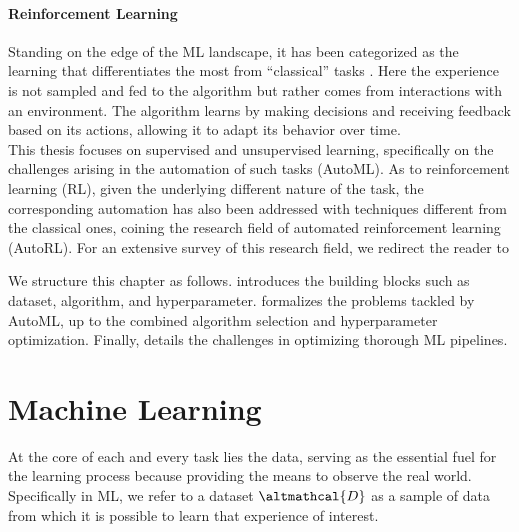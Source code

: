 \paragraph{Reinforcement Learning}
Standing on the edge of the ML landscape, it has been categorized as the learning that differentiates the most from ``classical'' tasks \cite{sutton2018reinforcement}.
Here the experience is not sampled and fed to the algorithm but rather comes from interactions with an environment.
The algorithm learns by making decisions and receiving feedback based on its actions, allowing it to adapt its behavior over time.\\

This thesis focuses on supervised and unsupervised learning, specifically on the challenges arising in the automation of such tasks (AutoML).
As to reinforcement learning (RL), given the underlying different nature of the task, the corresponding automation has also been addressed with techniques different from the classical ones, coining the research field of automated reinforcement learning (AutoRL).
For an extensive survey of this research field, we redirect the reader to \cite{autorl}

We structure this chapter as follows.  introduces the building blocks such as dataset, algorithm, and hyperparameter.
 formalizes the problems tackled by AutoML, up to the combined algorithm selection and hyperparameter optimization.
Finally,  details the challenges in optimizing thorough ML pipelines.

\section{Machine Learning}\label{automl-background-sec:ml}

At the core of each and every task lies the data, serving as the essential fuel for the learning process because providing the means to observe the real world.
Specifically in ML, we refer to a dataset $\altmathcal{D}$ as a sample of data from which it is possible to learn that experience of interest.

